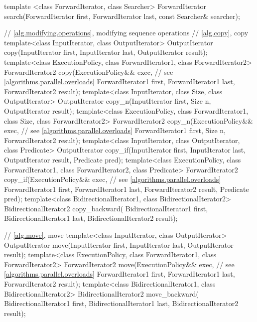 \begin{codeblock}
{  template <class ForwardIterator, class Searcher>
    ForwardIterator search(ForwardIterator first, ForwardIterator last,
                           const Searcher& searcher);

  // \ref{alg.modifying.operations}, modifying sequence operations
  // \ref{alg.copy}, copy
  template<class InputIterator, class OutputIterator>
    OutputIterator copy(InputIterator first, InputIterator last,
                        OutputIterator result);
  template<class ExecutionPolicy, class ForwardIterator1, class ForwardIterator2>
    ForwardIterator2 copy(ExecutionPolicy&& exec, // see \ref{algorithms.parallel.overloads}
                          ForwardIterator1 first, ForwardIterator1 last,
                          ForwardIterator2 result);
  template<class InputIterator, class Size, class OutputIterator>
    OutputIterator copy_n(InputIterator first, Size n,
                          OutputIterator result);
  template<class ExecutionPolicy, class ForwardIterator1, class Size,
           class ForwardIterator2>
    ForwardIterator2 copy_n(ExecutionPolicy&& exec, // see \ref{algorithms.parallel.overloads}
                            ForwardIterator1 first, Size n,
                            ForwardIterator2 result);
  template<class InputIterator, class OutputIterator, class Predicate>
    OutputIterator copy_if(InputIterator first, InputIterator last,
                           OutputIterator result, Predicate pred);
  template<class ExecutionPolicy, class ForwardIterator1, class ForwardIterator2,
           class Predicate>
    ForwardIterator2 copy_if(ExecutionPolicy&& exec, // see \ref{algorithms.parallel.overloads}
                             ForwardIterator1 first, ForwardIterator1 last,
                             ForwardIterator2 result, Predicate pred);
  template<class BidirectionalIterator1, class BidirectionalIterator2>
    BidirectionalIterator2 copy_backward(
      BidirectionalIterator1 first, BidirectionalIterator1 last,
      BidirectionalIterator2 result);

  // \ref{alg.move}, move
  template<class InputIterator, class OutputIterator>
    OutputIterator move(InputIterator first, InputIterator last,
                        OutputIterator result);
  template<class ExecutionPolicy, class ForwardIterator1,
           class ForwardIterator2>
    ForwardIterator2 move(ExecutionPolicy&& exec, // see \ref{algorithms.parallel.overloads}
                          ForwardIterator1 first, ForwardIterator1 last,
                          ForwardIterator2 result);
  template<class BidirectionalIterator1, class BidirectionalIterator2>
    BidirectionalIterator2 move_backward(
      BidirectionalIterator1 first, BidirectionalIterator1 last,
      BidirectionalIterator2 result);

}
\end{codeblock}
